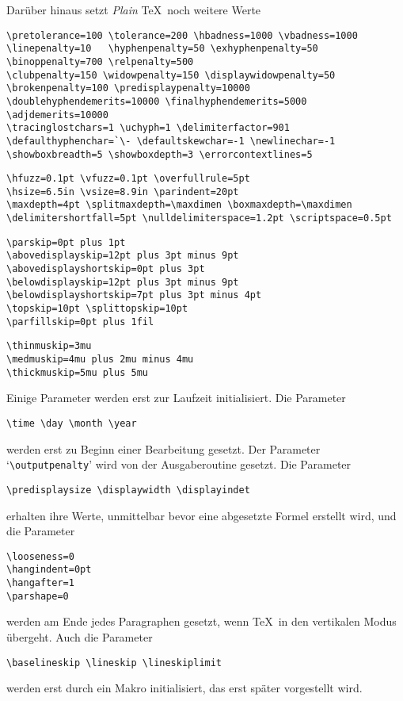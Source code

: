 \begin{appendix}
Dar\"uber hinaus setzt {\em Plain} \TeX\ noch weitere Werte
\begin{verbatim}
\pretolerance=100 \tolerance=200 \hbadness=1000 \vbadness=1000
\linepenalty=10   \hyphenpenalty=50 \exhyphenpenalty=50
\binoppenalty=700 \relpenalty=500
\clubpenalty=150 \widowpenalty=150 \displaywidowpenalty=50
\brokenpenalty=100 \predisplaypenalty=10000
\doublehyphendemerits=10000 \finalhyphendemerits=5000 \adjdemerits=10000
\tracinglostchars=1 \uchyph=1 \delimiterfactor=901
\defaulthyphenchar=`\- \defaultskewchar=-1 \newlinechar=-1
\showboxbreadth=5 \showboxdepth=3 \errorcontextlines=5
\end{verbatim}
\begin{verbatim}
\hfuzz=0.1pt \vfuzz=0.1pt \overfullrule=5pt
\hsize=6.5in \vsize=8.9in \parindent=20pt
\maxdepth=4pt \splitmaxdepth=\maxdimen \boxmaxdepth=\maxdimen
\delimitershortfall=5pt \nulldelimiterspace=1.2pt \scriptspace=0.5pt
\end{verbatim}
\begin{verbatim}
\parskip=0pt plus 1pt
\abovedisplayskip=12pt plus 3pt minus 9pt
\abovedisplayshortskip=0pt plus 3pt
\belowdisplayskip=12pt plus 3pt minus 9pt
\belowdisplayshortskip=7pt plus 3pt minus 4pt
\topskip=10pt \splittopskip=10pt
\parfillskip=0pt plus 1fil
\end{verbatim}
\begin{verbatim}
\thinmuskip=3mu
\medmuskip=4mu plus 2mu minus 4mu
\thickmuskip=5mu plus 5mu
\end{verbatim}
Einige Parameter werden erst zur Laufzeit initialisiert. Die Parameter
\begin{verbatim}
\time \day \month \year
\end{verbatim}
werden erst zu Beginn einer Bearbeitung gesetzt. Der Parameter
`\verb|\outputpenalty|' wird von der Ausgaberoutine gesetzt. Die
Parameter
\begin{verbatim}
\predisplaysize \displaywidth \displayindet
\end{verbatim}
erhalten ihre Werte, unmittelbar bevor eine 
abgesetzte Formel erstellt
wird, und die Parameter
\begin{verbatim}
\looseness=0
\hangindent=0pt
\hangafter=1
\parshape=0
\end{verbatim}
werden am Ende jedes Paragraphen gesetzt, wenn \TeX\ in den vertikalen
Modus \"ubergeht. Auch die Parameter
\begin{verbatim}
\baselineskip \lineskip \lineskiplimit
\end{verbatim}
werden erst durch ein Makro initialisiert, das erst sp\"ater vorgestellt
wird.


\end{appendix}
